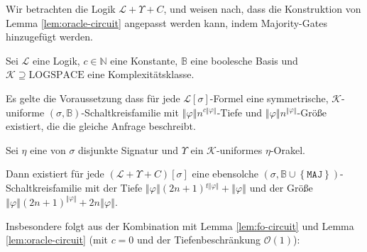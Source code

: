 Wir betrachten die Logik $\mathcal{L}+\Upsilon+C$, und weisen nach,
dass die Konstruktion von Lemma \ref{lem:oracle-circuit} angepasst
werden kann, indem Majority-Gates hinzugefügt werden.
\begin{lem}
\label{lem:counting-circuit}Sei $\mathcal{L}$ eine Logik, $c\in\mathbb{N}$
eine Konstante, $\mathbb{B}$ eine boolesche Basis und $\mathcal{K}\supseteq\mathrm{LOGSPACE}$
eine Komplexitätsklasse.

Es gelte die Voraussetzung dass für jede $\mathcal{L}\left[\sigma\right]$-Formel
eine symmetrische, $\mathcal{K}$-uniforme $\left(\sigma,\mathbb{B}\right)$-Schaltkreisfamilie
mit $\left\Vert \varphi\right\Vert n^{c\left\Vert \varphi\right\Vert }$-Tiefe
und $\left\Vert \varphi\right\Vert n^{\left\Vert \varphi\right\Vert }$-Größe
existiert, die die gleiche Anfrage beschreibt.

Sei $\eta$ eine von $\sigma$ disjunkte Signatur und $\Upsilon$
ein $\mathcal{K}$-uniformes $\eta$-Orakel.

Dann existiert für jede $\left(\mathcal{L}+\Upsilon+C\right)\left[\sigma\right]$
eine ebensolche $\left(\sigma,\mathbb{B}\cup\left\{ \mathtt{MAJ}\right\} \right)$-Schaltkreisfamilie
mit der Tiefe $\left\Vert \varphi\right\Vert \left(2n+1\right){}^{t\left\Vert \varphi\right\Vert }+\left\Vert \varphi\right\Vert $
und der Größe $\left\Vert \varphi\right\Vert \left(2n+1\right)^{\left\Vert \varphi\right\Vert }+2n\left\Vert \varphi\right\Vert $. 
\end{lem}
Insbesondere folgt aus der Kombination mit Lemma \ref{lem:fo-circuit}
und Lemma \ref{lem:oracle-circuit} (mit $c=0$ und der Tiefenbeschränkung
$\mathcal{O}\left(1\right)$):

